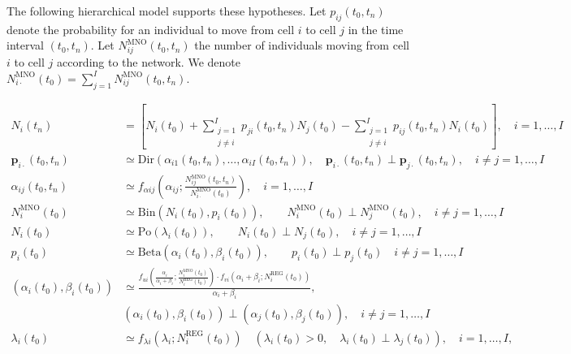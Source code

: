 \documentclass[12pt, a4paper]{article}
\begin{document}
The following hierarchical model supports these hypotheses. Let $p_{ij}(t_{0}, t_{n})$ denote the probability 
for an individual to move from cell $i$ to cell $j$ in the time interval $(t_{0}, t_{n})$. Let $N_{ij}^{\textrm{MNO}}(t_{0}, t_{n})$ the 
number of individuals moving from cell $i$ to cell $j$ according to the network. We denote $N_{i\cdot}^{\textrm{MNO}}(t_{0})=\sum_{j=1}^{I}N_{ij}^{\textrm{MNO}}(t_{0}, t_{n})$. 

\begin{subequations}
	\begin{align}
	\label{eq:Model2Ini}N_{i}(t_{n}) & = \left[ N_{i}(t_{0}) + \sum_{\substack{j=1\\j\neq i}}^{I}p_{ji}(t_{0}, t_{n})N_{j}(t_{0})-\sum_{\substack{j=1\\j\neq i}}^{I}p_{ij}(t_{0}, t_{n}) N_{i}(t_{0})\right ],\quad i=1,\dots,I\\ 
	\label{eq:Model2Mid}\mathbf{p}_{i\cdot}(t_{0}, t_{n})& \simeq\textrm{Dir}\left(\alpha_{i1}(t_{0}, t_{n}), \dots, \alpha_{iI}(t_{0}, t_{n})\right),\quad \mathbf{p}_{i\cdot}(t_{0}, t_{n})\perp\mathbf{p}_{j\cdot}(t_{0}, t_{n}),\quad i\neq j=1,\dots,I\\
	\label{eq:Model2Fin}\alpha_{ij}(t_{0}, t_{n})&\simeq f_{\alpha ij}\left(\alpha_{ij}; \frac{N_{ij}^{\textrm{MNO}}(t_{0}, t_{n})}{N_{i\cdot}^{\textrm{MNO}}(t_{0})}\right), \quad i=1,\dots,I\\
	\label{eq:Model1Ini}N_{i}^{\textrm{MNO}}(t_{0})&\simeq\textrm{Bin}\left(N_{i}(t_{0}), p_{i}(t_{0})\right),\qquad N_{i}^{\textrm{MNO}}(t_{0})\perp N_{j}^{\textrm{MNO}}(t_{0}),\quad i\neq j=1,\dots,I\\
	N_{i}(t_{0})&\simeq\textrm{Po}\left(\lambda_{i}(t_{0})\right),\qquad N_{i}(t_{0})\perp N_{j}(t_{0}),\quad i\neq j=1,\dots,I\\
	p_{i}(t_{0})&\simeq\textrm{Beta}\left(\alpha_{i}(t_{0}),\beta_{i}(t_{0})\right),\qquad p_{i}(t_{0})\perp p_{j}(t_{0})\quad i\neq j=1,\dots,I\\
	\left(\alpha_{i}(t_{0}), \beta_{i}(t_{0})\right)&\simeq \frac{f_{ui}\left(\frac{\alpha_{i}}{\alpha_{i}+\beta_{i}}; \frac{N_{i}^{\textrm{MNO}}(t_{0})}{N_{i}^{\textrm{REG}}(t_{0})}\right)\cdot f_{vi}\left(\alpha_{i}+\beta_{i}; N_{i}^{\textrm{REG}}(t_{0})\right)}{\alpha_{i}+\beta_{i}},\nonumber \\ &(\alpha_{i}(t_{0}),\beta_{i}(t_{0}))\perp(\alpha_{j}(t_{0}),\beta_{j}(t_{0})),\quad i\neq j=1,\dots,I\\
	\label{eq:Model1Fin}\lambda_{i}(t_{0})&\simeq f_{\lambda i}(\lambda_{i}; N_{i}^{\textrm{REG}}(t_{0}))\quad (\lambda_{i}(t_{0}) > 0,\quad \lambda_{i}(t_{0})\perp\lambda_{j}(t_{0})), \quad i=1,\dots,I,
	\end{align}
\end{subequations}
\end{document}
